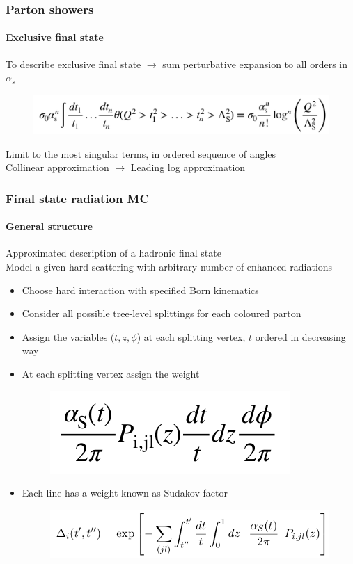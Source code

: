\documentclass[aspectratio=43]{beamer}
\begin{document}
\begin{frame}
	
	\frametitle{Parton showers}
	\framesubtitle{Exclusive final state}
	
	\footnotesize To describe exclusive final state $\rightarrow$ sum perturbative expansion to all orders in $\alpha_s$ \\
	
	\begin{figure}
		\includegraphics[width = 9 cm]{plots/exclusive_ll.png}
	\end{figure}
	
	\center \footnotesize Limit to the most singular terms, in ordered sequence of angles \\
	\center \color{red} Collinear approximation $\longrightarrow$ Leading log approximation

\end{frame}

\begin{frame}

	\frametitle{Final state radiation MC}
	\framesubtitle{General structure}
	
	\footnotesize Approximated description of a hadronic final state \\
	\footnotesize Model a given hard scattering with arbitrary number of enhanced radiations

	\begin{itemize} 
		\item Choose hard interaction with specified Born kinematics
		\item Consider all possible tree-level splittings for each coloured parton
		\item Assign the variables ($t, z, \phi$) at each splitting vertex, $t$ ordered in decreasing way
		\item At each splitting vertex assign the weight 
		\begin{figure}
			\includegraphics[width = 2.5 cm]{plots/AP_weight.png}
		\end{figure}
		\item Each line has a weight known as Sudakov factor
		\begin{figure}
			\includegraphics[width = 7 cm]{plots/sudakov.png}
		\end{figure}
	\end{itemize}

\end{frame}
\end{document}
